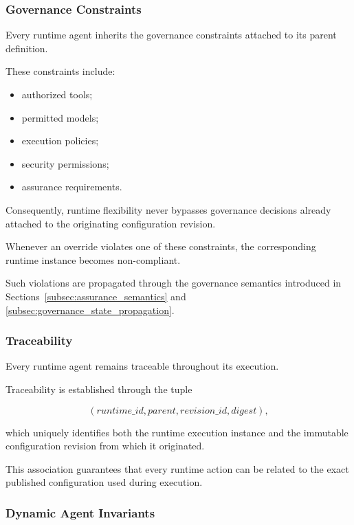 \documentclass[10pt]{article}
\begin{document}
\subsubsection{Governance Constraints}

Every runtime agent inherits the governance constraints attached to its parent
definition.

These constraints include:

\begin{itemize}
\item authorized tools;
\item permitted models;
\item execution policies;
\item security permissions;
\item assurance requirements.
\end{itemize}

Consequently, runtime flexibility never bypasses governance decisions already
attached to the originating configuration revision.

Whenever an override violates one of these constraints, the corresponding
runtime instance becomes non-compliant.

Such violations are propagated through the governance semantics introduced in
Sections~\ref{subsec:assurance_semantics} and
\ref{subsec:governance_state_propagation}.

\subsubsection{Traceability}

Every runtime agent remains traceable throughout its execution.

Traceability is established through the tuple

\[
(
runtime\_id,
parent,
revision\_id,
digest
),
\tag{35}
\]

which uniquely identifies both the runtime execution instance and the immutable
configuration revision from which it originated.

This association guarantees that every runtime action can be related to the
exact published configuration used during execution.

\subsubsection{Dynamic Agent Invariants}
\end{document}
